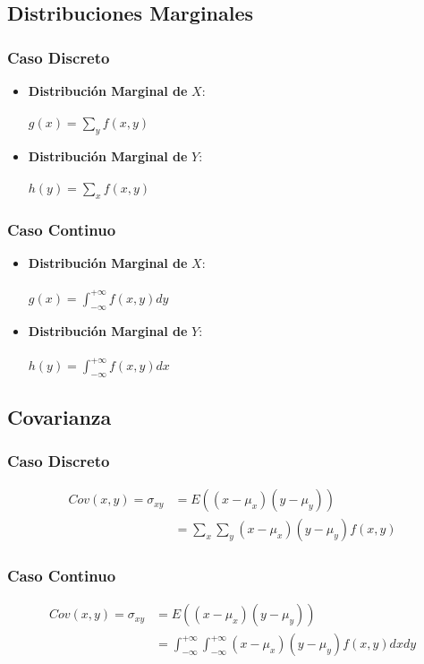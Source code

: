 \documentclass[10pt,letterpaper]{article}
\begin{document}
\subsection{Distribuciones Marginales}
\begin{multicols}{2}
\subsubsection{Caso Discreto}
\begin{itemize}
\item \textbf{Distribución Marginal de }$X$:\\ \vspace{0.05cm} \\
$g(x)=\displaystyle\sum_y f(x,y)$
\item \textbf{Distribución Marginal de }$Y$:\\ \vspace{0.05cm} \\
$h(y)=\displaystyle\sum_x f(x,y)$
\end{itemize}
\columnbreak
\subsubsection{Caso Continuo}
\begin{itemize}
\item \textbf{Distribución Marginal de }$X$:\\ \vspace{0.05cm} \\
$g(x)=\displaystyle\int_{-\infty}^{+\infty} f(x,y)dy$
\item \textbf{Distribución Marginal de }$Y$:\\ \vspace{0.05cm} \\
$h(y)=\displaystyle\int_{-\infty}^{+\infty} f(x,y)dx$
\end{itemize}
\end{multicols}
\pagebreak
\subsection{Covarianza}

\begin{multicols}{2}
\subsubsection{Caso Discreto}
\begin{align*}
Cov(x,y)=\sigma_{xy}&=E((x-\mu_x)(y-\mu_y)) \\
&=\displaystyle\sum_x\sum_y (x-\mu_x)(y-\mu_y)f(x,y)
\end{align*}
\columnbreak
\subsubsection{Caso Continuo}
\begin{align*}
Cov(x,y)=\sigma_{xy}&=E((x-\mu_x)(y-\mu_y)) \\
&=\displaystyle\int_{-\infty}^{+\infty}\int_{-\infty}^{+\infty} (x-\mu_x)(y-\mu_y)f(x,y)dxdy
\end{align*}
\end{multicols}
\end{document}
